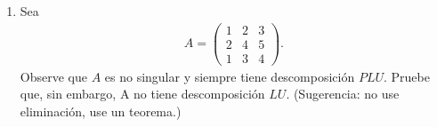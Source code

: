 \documentclass[11pt,letterpaper]{article}
\newcommand{\finf}{\blacksquare.}
\newtheorem{thmt}{Teorema:}
\begin{document}
\begin{enumerate}
\begin{align*}
\begin{pmatrix}
1 & 0 & 0\\
3 & 1 & 0\\
2 & 1 & 1
\end{pmatrix}
\end{align*}
Por lo tanto, la descomposición LDU de la matriz original es: 
\begin{align*}
\begin{pmatrix}
1 & 2 & 4\\
3 & 8 & 14\\
2 & 6 & 13
\end{pmatrix}=\begin{pmatrix}
1 & 0 & 0\\
3 & 1 & 0\\
2 & 1 & 1
\end{pmatrix}\begin{pmatrix}
1 & 0 & 0\\
0 & 2 & 0\\
0 & 0 & 3
\end{pmatrix}\begin{pmatrix}
1 & 2 & 4\\
0 & 1 & 1\\
0 & 0 & 1
\end{pmatrix}. \ \ \ \finf
\end{align*}
Nota, para las inversas de las matrices elementales ocupamos el siguiente teorema:
\begin{framed}
    \begin{thmt} \label{inversa_elemental}
    Sea $E_{ij}(\alpha)$ es la matriz elemental que multiplica al renglón $j$ por $\alpha$ y lo suma al renglón $i$, entonces la matriz inversa de $E_{ij}(\alpha)$ es $E_{ij}(-\alpha).$
    \end{thmt}
\end{framed} 

\item Sea 
\begin{align*}
A=\begin{pmatrix}
1 & 2 & 3\\
2 & 4 & 5\\
1 & 3 & 4
\end{pmatrix}.
\end{align*}
Observe que $A$ es no singular y siempre tiene descomposición $PLU$. Pruebe que, sin embargo, A no tiene descomposición $LU$. (Sugerencia: no use eliminación, use un teorema.)


\end{enumerate}
\end{document}
